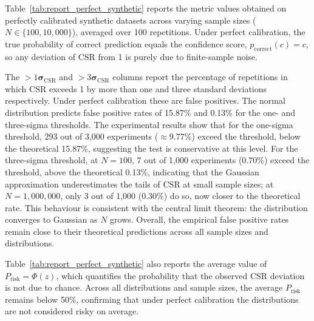 \documentclass{article}
\theoremstyle{plain}
\theoremstyle{definition}
\theoremstyle{remark}
\begin{document}
Table~\ref{tab:report_perfect_synthetic} reports the metric values obtained on perfectly calibrated synthetic datasets across varying sample sizes ($N \in \{100, 10{,}000\}$), averaged over 100 repetitions. Under perfect calibration, the true probability of correct prediction equals the confidence score, $p_{\text{correct}}(c) = c$, so any deviation of $\mathrm{CSR}$ from 1 is purely due to finite-sample noise.

The $>1\boldsymbol{\sigma}_{\mathrm{CSR}}$ and $>3\boldsymbol{\sigma}_{\mathrm{CSR}}$ columns report the percentage of repetitions in which $\mathrm{CSR}$ exceeds 1 by more than one and three standard deviations respectively. Under perfect calibration these are false positives. The normal distribution predicts false positive rates of 15.87\% and 0.13\% for the one- and three-sigma thresholds. The experimental results show that for the one-sigma threshold, 293 out of 3,000 experiments ($\approx 9.77\%$) exceed the threshold, below the theoretical 15.87\%, suggesting the test is conservative at this level. For the three-sigma threshold, at $N = 100$, 7 out of 1,000 experiments ($0.70\%$) exceed the threshold, above the theoretical 0.13\%, indicating that the Gaussian approximation underestimates the tails of $\mathrm{CSR}$ at small sample sizes; at $N = 1{,}000{,}000$, only 3 out of 1,000 ($0.30\%$) do so, now closer to the theoretical rate. This behaviour is consistent with the central limit theorem: the distribution converges to Gaussian as $N$ grows. Overall, the empirical false positive rates remain close to their theoretical predictions across all sample sizes and distributions.

Table~\ref{tab:report_perfect_synthetic} also reports the average value of $P_{\mathrm{risk}} = \Phi(z)$, which quantifies the probability that the observed $\mathrm{CSR}$ deviation is not due to chance. Across all distributions and sample sizes, the average $P_{\mathrm{risk}}$ remains below 50\%, confirming that under perfect calibration the distributions are not considered risky on average.
\end{document}
